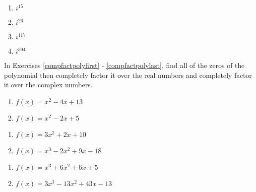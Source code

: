 \begin{multicols}{4}
\begin{enumerate}
\setcounter{enumi}{\value{HW}}

\item $i^{15}$
\item $i^{26}$
\item $i^{117}$
\item $i^{304}$ \label{powerofilast}

\setcounter{HW}{\value{enumi}}
\end{enumerate}
\end{multicols}

In Exercises \ref{compfactpolyfirst} - \ref{compfactpolylast}, find all of the zeros of the polynomial then completely factor it over the real numbers and completely factor it over the complex numbers.

\begin{multicols}{2}
\begin{enumerate}
\setcounter{enumi}{\value{HW}}

\item $f(x) = x^{2} - 4x + 13$ \label{compfactpolyfirst}
\item $f(x) = x^2 - 2x + 5$

\setcounter{HW}{\value{enumi}}
\end{enumerate}
\end{multicols}

\begin{multicols}{2}
\begin{enumerate}
\setcounter{enumi}{\value{HW}}

\item $f(x) = 3x^{2} + 2x + 10$
\item $f(x) = x^3-2x^2+9x-18$

\setcounter{HW}{\value{enumi}}
\end{enumerate}
\end{multicols}

\begin{multicols}{2}
\begin{enumerate}
\setcounter{enumi}{\value{HW}}

\item $f(x) = x^{3} + 6x^{2} + 6x + 5$
\item $f(x) = 3x^{3} - 13x^{2} + 43x - 13$

\setcounter{HW}{\value{enumi}}
\end{enumerate}
\end{multicols}

